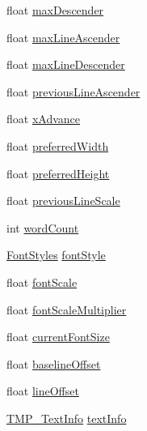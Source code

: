 \begin{DoxyCompactItemize}
float \mbox{\hyperlink{struct_t_m_pro_1_1_word_wrap_state_a9b9d037d4a7d05ae2007391bf6d616ab}{max\+Descender}}
\item 
float \mbox{\hyperlink{struct_t_m_pro_1_1_word_wrap_state_a1d7408a4074c8b6bff9083d7f8b9fc15}{max\+Line\+Ascender}}
\item 
float \mbox{\hyperlink{struct_t_m_pro_1_1_word_wrap_state_a0006561a5a80f7c2020dd431c11cdf26}{max\+Line\+Descender}}
\item 
float \mbox{\hyperlink{struct_t_m_pro_1_1_word_wrap_state_a9cfee405320019a432f26cc204e944ac}{previous\+Line\+Ascender}}
\item 
float \mbox{\hyperlink{struct_t_m_pro_1_1_word_wrap_state_ab252611e74da892ea573740107a20ed3}{x\+Advance}}
\item 
float \mbox{\hyperlink{struct_t_m_pro_1_1_word_wrap_state_a44db30a1313e857f5aceb41bda5bc3ca}{preferred\+Width}}
\item 
float \mbox{\hyperlink{struct_t_m_pro_1_1_word_wrap_state_a4d6d2bef5329ff9f17dd0d745f8618cc}{preferred\+Height}}
\item 
float \mbox{\hyperlink{struct_t_m_pro_1_1_word_wrap_state_a236177e3f9cd0ae8a6c688a927faee19}{previous\+Line\+Scale}}
\item 
int \mbox{\hyperlink{struct_t_m_pro_1_1_word_wrap_state_a59cdd2ef1b57ab28ede52355e148ed95}{word\+Count}}
\item 
\mbox{\hyperlink{namespace_t_m_pro_aedf79b6e7e2ce2b9c9ac84e790596e7c}{Font\+Styles}} \mbox{\hyperlink{struct_t_m_pro_1_1_word_wrap_state_a52af8f77eb6929797cdf0251a3f5951d}{font\+Style}}
\item 
float \mbox{\hyperlink{struct_t_m_pro_1_1_word_wrap_state_a48e84424b62c2d6ff1e9f7fd97fcf031}{font\+Scale}}
\item 
float \mbox{\hyperlink{struct_t_m_pro_1_1_word_wrap_state_afbd655b9a72d1a17996f72ddc1701d59}{font\+Scale\+Multiplier}}
\item 
float \mbox{\hyperlink{struct_t_m_pro_1_1_word_wrap_state_a17078a869763dcc95df4367b55fe74f5}{current\+Font\+Size}}
\item 
float \mbox{\hyperlink{struct_t_m_pro_1_1_word_wrap_state_a4e61211834f6c240592e4010214ba8eb}{baseline\+Offset}}
\item 
float \mbox{\hyperlink{struct_t_m_pro_1_1_word_wrap_state_a4060c068cfda0b875bf1c1dfe258c93f}{line\+Offset}}
\item 
\mbox{\hyperlink{class_t_m_pro_1_1_t_m_p___text_info}{T\+M\+P\+\_\+\+Text\+Info}} \mbox{\hyperlink{struct_t_m_pro_1_1_word_wrap_state_a9aee5d1309f56ff5fc7f2b8515c97751}{text\+Info}}

\end{DoxyCompactItemize}
